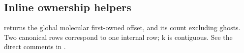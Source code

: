 \subsection{Inline ownership helpers}
 returns the global molecular first-owned offset, and  its count excluding ghosts. Two canonical rows correspond to one internal row; k is contiguous. See the direct comments in .
